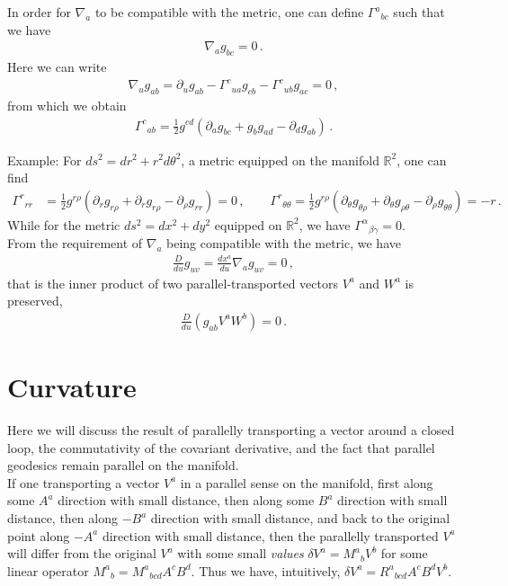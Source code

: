 \documentclass[11pt, onesided]{book}
\theoremstyle{break}
\theoremstyle{break}
\newcommand{\R}{\mathbb{R}}
\newcommand{\pd}{\partial}
\newcommand{\example}{\color{green}Example: \color{black}}
\begin{document}
In order for $\nabla_a$ to be compatible with the metric, one can define $\Gamma^{a}{}_{bc}$ such that we have
\begin{align*}
\nabla_a g_{bc} = 0\,.
\end{align*}
Here we can write
\begin{align*}
\nabla_u g_{ab} = \pd_u g_{ab} - \Gamma^c{}_{ua}g_{cb} - \Gamma^c{}_{ub}g_{ac} = 0\,,
\end{align*}
from which we obtain
\begin{align*}
\Gamma^c{}_{ab} = \frac{1}{2}g^{cd}\left(\pd_a g_{bc} + g_bg_{ad} - \pd_d g_{ab}\right)\,.
\end{align*}

\example
For $ds^2 = dr^2 + r^2 d\theta^2$, a metric equipped on the manifold $\R^2$, one can find
\begin{align*}
\Gamma^r{}_{rr} &= \frac{1}{2}g^{r\rho} \left( \pd_r g_{r\rho} + \pd_r g_{r\rho} - \pd_\rho g_{rr}\right) = 0\,,\qquad
\Gamma^r{}_{\theta\theta} = \frac{1}{2}g^{r\rho}\left( \pd_\theta g_{\theta \rho}+\pd_\theta g_{\rho \theta} -\pd_\rho g_{\theta\theta}\right) = -r\,.
\end{align*}
While for the metric $ds^2 = dx^2 + dy^2$ equipped on $\R^2$, we have $\Gamma^\alpha{}_{\beta \gamma} = 0$. \\

From the requirement of $\nabla_a$ being compatible with the metric, we have
\begin{align*}
\frac{D}{du}g_{uv} = \frac{dx^a}{du}\nabla_a g_{uv} = 0\,,
\end{align*}
that is the inner product of two parallel-transported vectors $V^a$ and $W^a$ is preserved,
\begin{align*}
\frac{D}{du}\left( g_{ab} V^a W^b \right) = 0\,.
\end{align*}


\section[Curvature]{\color{red}Curvature \color{black}}
Here we will discuss the result of parallelly transporting a vector around a closed loop, the commutativity of the covariant derivative, and the fact that parallel geodesics remain parallel on the manifold.\\

If one transporting a vector $V^a$ in a parallel sense on the manifold, first along some $A^a$ direction with small distance, then along some $B^a$ direction with small distance, then along $-B^a$ direction with small distance, and back to the original point along $-A^a$ direction with small distance, then the parallelly transported $V^a$ will differ from the original $V^a$ with some small \textit{values} $\delta V^a = M^a{}_bV^b$ for some linear operator $M^a{}_b = M^a{}_{bcd} A^cB^d$. Thus we have, intuitively, $\delta V^a = R^a{}_{bcd}A^cB^dV^b$. \\
\end{document}
